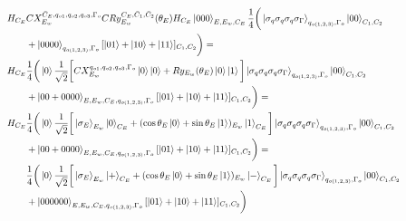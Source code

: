 \begin{equation}
   \resizebox{.9\hsize}{!}{$\begin{split}
        H_{C_E}&CX_{E_w}^{\bar{C}_E,q_{o1},q_{o2},q_{o3},\Gamma_o}CRy_{E_w}^{C_E,\bar{C}_1,\bar{C}_2}(\theta_E)H_{C_E}\ket{000}_{E,E_w,C_E}
        \frac{1}{4}\bigg(
        \ket{\sigma_q\sigma_q\sigma_q\sigma_\Gamma}_{q_{o(1,2,3)},\Gamma_{o}}\ket{00}_{C_1,C_2}\\&+
        \ket{0000}_{q_{o(1,2,3)},\Gamma_o}[\ket{01}+\ket{10}+\ket{11}]_{C_1,C_2}\bigg)=\\
        H_{C_E}&\frac{1}{4}\bigg(\ket{0}\frac{1}{\sqrt{2}}\bigg[CX_{E_w}^{q_{o1},q_{o2},q_{o3},\Gamma_o}\ket{0}\ket{0}+Ry_{E_w}(\theta_E)\ket{0}\ket{1}\bigg]
        \ket{\sigma_q\sigma_q\sigma_q\sigma_\Gamma}_{q_{o(1,2,3)},\Gamma_{o}}\ket{00}_{C_1,C_2}\\&+
        \ket{00+0000}_{E,E_w,C_E,q_{o(1,2,3)},\Gamma_o}[\ket{01}+\ket{10}+\ket{11}]_{C_1,C_2}\bigg)=\\
        H_{C_E}&\frac{1}{4}\bigg(\ket{0}\frac{1}{\sqrt{2}}\bigg[\ket{\sigma_E}_{E_w}\ket{0}_{C_E}+(\cos\theta_E\ket{0}+\sin\theta_E\ket{1})_{E_w}\ket{1}_{C_E}\bigg]\ket{\sigma_q\sigma_q\sigma_q\sigma_\Gamma}_{q_{o(1,2,3)},\Gamma_{o}}\ket{00}_{C_1,C_2}\\&+
        \ket{00+0000}_{E,E_w,C_E,q_{o(1,2,3)},\Gamma_o}[\ket{01}+\ket{10}+\ket{11}]_{C_1,C_2}\bigg)=\\
        &\frac{1}{4}\bigg(\ket{0}\frac{1}{\sqrt{2}}\bigg[\ket{\sigma_E}_{E_w}\ket{+}_{C_E}+(\cos\theta_E\ket{0}+\sin\theta_E\ket{1})_{E_w}\ket{-}_{C_E}\bigg]\ket{\sigma_q\sigma_q\sigma_q\sigma_\Gamma}_{q_{o(1,2,3)},\Gamma_{o}}\ket{00}_{C_1,C_2}\\&+
        \ket{000000}_{E,E_w,C_E,q_{o(1,2,3)},\Gamma_o}[\ket{01}+\ket{10}+\ket{11}]_{C_1,C_2}\bigg)\\
   \end{split}$}
\end{equation}

